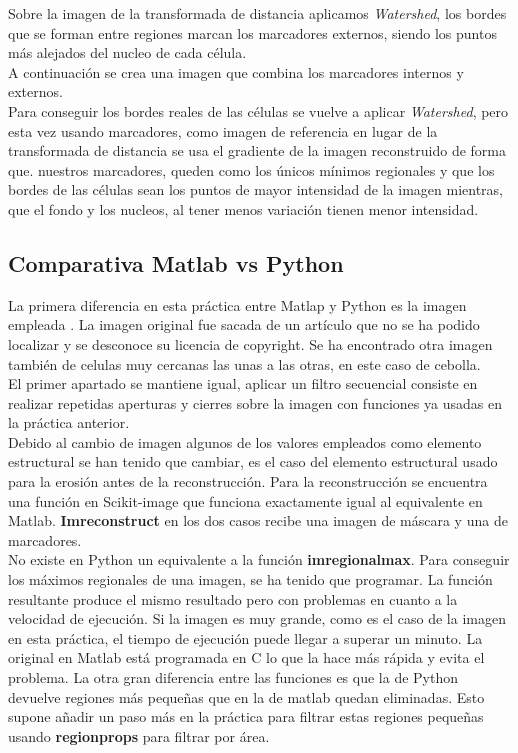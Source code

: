 \documentclass[a4paper,12pt]{report}
\begin{document}
Sobre la imagen de la transformada de distancia aplicamos  \emph{Watershed}, los bordes que se forman entre regiones marcan los marcadores externos, siendo los puntos más alejados del nucleo de cada célula.\\

A continuación se crea una imagen que combina los marcadores internos y externos. \\

Para conseguir los bordes reales de las células se vuelve a aplicar  \emph{Watershed}, pero esta vez usando marcadores, como imagen de referencia en lugar de la transformada de distancia se usa el gradiente de la imagen reconstruido de forma que. nuestros marcadores, queden como los únicos mínimos regionales y que los bordes de las células sean los puntos de mayor intensidad de la imagen mientras, que el fondo y los nucleos, al tener menos variación tienen menor intensidad.\\


\subsection{Comparativa Matlab vs Python}

La primera diferencia en esta práctica entre Matlap y Python es la imagen empleada . La imagen original fue sacada de un artículo que no se ha podido localizar y se desconoce su licencia de copyright. Se ha encontrado otra imagen también de celulas muy cercanas las unas a las otras, en este caso de cebolla.\\

El primer apartado se mantiene igual, aplicar un filtro secuencial consiste en realizar repetidas aperturas y cierres sobre la imagen con funciones ya usadas en la práctica anterior.\\

Debido al cambio de imagen algunos de los valores empleados como elemento estructural se han tenido que cambiar, es el caso del elemento estructural usado para la erosión antes de la reconstrucción. Para la reconstrucción se encuentra una función en Scikit-image que funciona exactamente igual al equivalente en Matlab. \textbf{Imreconstruct} en los dos casos recibe una imagen de máscara y una de marcadores.\\

No existe en Python un equivalente a la función \textbf{imregionalmax}. Para conseguir los máximos regionales de una imagen, se ha tenido que programar. La función resultante produce el mismo resultado pero con problemas en cuanto a la velocidad de ejecución.  Si la imagen es muy grande, como es el caso de la imagen en esta práctica, el tiempo de ejecución puede llegar a superar un minuto. La original en Matlab está programada en C lo que la hace más rápida y evita el problema. La otra gran diferencia entre las funciones es que la de Python devuelve regiones más pequeñas que en la de matlab quedan eliminadas. Esto supone añadir un paso más en la práctica para filtrar estas regiones pequeñas usando\textbf{ regionprops} para filtrar por área.\\
\end{document}
